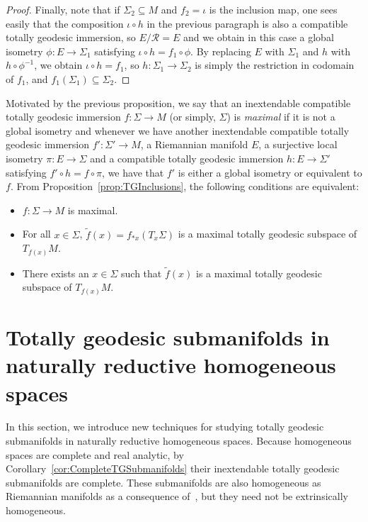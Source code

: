 \documentclass[11pt,a4paper,final]{amsart}
\renewcommand{\tilde}{\widetilde}
\theoremstyle{definition}
\begin{document}
\begin{proof}
	Finally, note that if $\Sigma_{2}\subseteq M$ and $f_{2}=\iota$ is the inclusion map, one sees easily that the composition $\iota \circ h$ in the previous paragraph is also a compatible totally geodesic immersion, so $E/\mathcal{R}=E$ and we obtain in this case a global isometry $\phi\colon E\to \Sigma_{1}$ satisfying $\iota\circ h=f_{1}\circ \phi$.
	By replacing $E$ with $\Sigma_{1}$ and $h$ with $h\circ\phi^{-1}$, we obtain $\iota\circ h=f_{1}$, so $h\colon \Sigma_{1}\to\Sigma_{2}$ is simply the restriction in codomain of $f_{1}$, and $f_{1}(\Sigma_{1})\subseteq \Sigma_{2}$. \qedhere
\end{proof}

Motivated by the previous proposition, we say that an inextendable compatible totally geodesic immersion $f\colon \Sigma\to M$ (or simply, $\Sigma$) is \emph{maximal} if it is not a global isometry and whenever we have another inextendable compatible totally geodesic immersion $f'\colon \Sigma'\to M$, a Riemannian manifold $E$, a surjective local isometry $\pi\colon E\to \Sigma$ and a compatible totally geodesic immersion $h\colon E\to \Sigma'$ satisfying $f'\circ h = f \circ \pi$, we have that $f'$ is either a global isometry or equivalent to $f$.
From Proposition~\ref{prop:TGInclusions}, the following conditions are equivalent:
\begin{itemize}
	\item $f\colon\Sigma \to M$ is maximal.
	\item For all $x\in\Sigma$, $\tilde{f}(x)=f_{*x}(T_{x}\Sigma)$ is a maximal totally geodesic subspace of $T_{f(x)}M$.
	\item There exists an $x\in\Sigma$ such that $\tilde{f}(x)$ is a maximal totally geodesic subspace of $T_{f(x)}M$.
\end{itemize}

\section{Totally geodesic submanifolds in naturally reductive homogeneous spaces}
\label{sec:tgnatred}
In this section, we introduce new techniques for studying totally geodesic submanifolds in naturally reductive homogeneous spaces.
Because homogeneous spaces are complete and real analytic, by Corollary~\ref{cor:CompleteTGSubmanifolds} their inextendable totally geodesic submanifolds are complete.
These submanifolds are also homogeneous as Riemannian manifolds as a consequence of~\cite[Theorem~8.9]{KobayashiNomizu2}, but they need not be extrinsically homogeneous.
\end{document}
